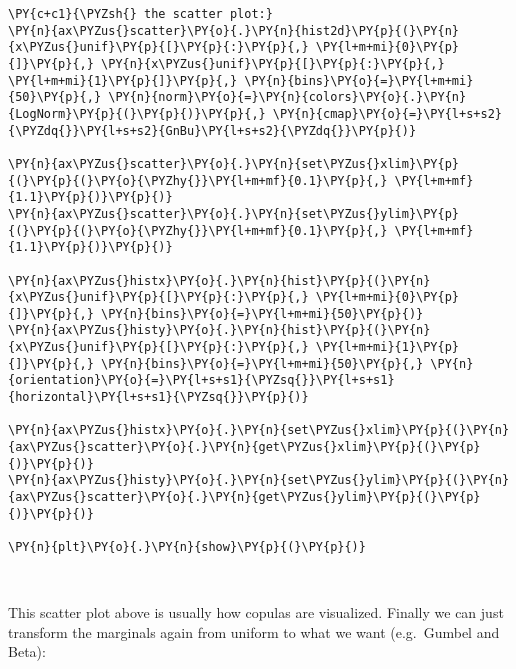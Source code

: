 \begin{tcolorbox}[breakable, size=fbox, boxrule=1pt, pad at break*=1mm,colback=cellbackground, colframe=cellborder]
\begin{Verbatim}[commandchars=\\\{\}]
\PY{c+c1}{\PYZsh{} the scatter plot:}
\PY{n}{ax\PYZus{}scatter}\PY{o}{.}\PY{n}{hist2d}\PY{p}{(}\PY{n}{x\PYZus{}unif}\PY{p}{[}\PY{p}{:}\PY{p}{,} \PY{l+m+mi}{0}\PY{p}{]}\PY{p}{,} \PY{n}{x\PYZus{}unif}\PY{p}{[}\PY{p}{:}\PY{p}{,} \PY{l+m+mi}{1}\PY{p}{]}\PY{p}{,} \PY{n}{bins}\PY{o}{=}\PY{l+m+mi}{50}\PY{p}{,} \PY{n}{norm}\PY{o}{=}\PY{n}{colors}\PY{o}{.}\PY{n}{LogNorm}\PY{p}{(}\PY{p}{)}\PY{p}{,} \PY{n}{cmap}\PY{o}{=}\PY{l+s+s2}{\PYZdq{}}\PY{l+s+s2}{GnBu}\PY{l+s+s2}{\PYZdq{}}\PY{p}{)}

\PY{n}{ax\PYZus{}scatter}\PY{o}{.}\PY{n}{set\PYZus{}xlim}\PY{p}{(}\PY{p}{(}\PY{o}{\PYZhy{}}\PY{l+m+mf}{0.1}\PY{p}{,} \PY{l+m+mf}{1.1}\PY{p}{)}\PY{p}{)}
\PY{n}{ax\PYZus{}scatter}\PY{o}{.}\PY{n}{set\PYZus{}ylim}\PY{p}{(}\PY{p}{(}\PY{o}{\PYZhy{}}\PY{l+m+mf}{0.1}\PY{p}{,} \PY{l+m+mf}{1.1}\PY{p}{)}\PY{p}{)}

\PY{n}{ax\PYZus{}histx}\PY{o}{.}\PY{n}{hist}\PY{p}{(}\PY{n}{x\PYZus{}unif}\PY{p}{[}\PY{p}{:}\PY{p}{,} \PY{l+m+mi}{0}\PY{p}{]}\PY{p}{,} \PY{n}{bins}\PY{o}{=}\PY{l+m+mi}{50}\PY{p}{)}
\PY{n}{ax\PYZus{}histy}\PY{o}{.}\PY{n}{hist}\PY{p}{(}\PY{n}{x\PYZus{}unif}\PY{p}{[}\PY{p}{:}\PY{p}{,} \PY{l+m+mi}{1}\PY{p}{]}\PY{p}{,} \PY{n}{bins}\PY{o}{=}\PY{l+m+mi}{50}\PY{p}{,} \PY{n}{orientation}\PY{o}{=}\PY{l+s+s1}{\PYZsq{}}\PY{l+s+s1}{horizontal}\PY{l+s+s1}{\PYZsq{}}\PY{p}{)}

\PY{n}{ax\PYZus{}histx}\PY{o}{.}\PY{n}{set\PYZus{}xlim}\PY{p}{(}\PY{n}{ax\PYZus{}scatter}\PY{o}{.}\PY{n}{get\PYZus{}xlim}\PY{p}{(}\PY{p}{)}\PY{p}{)}
\PY{n}{ax\PYZus{}histy}\PY{o}{.}\PY{n}{set\PYZus{}ylim}\PY{p}{(}\PY{n}{ax\PYZus{}scatter}\PY{o}{.}\PY{n}{get\PYZus{}ylim}\PY{p}{(}\PY{p}{)}\PY{p}{)}

\PY{n}{plt}\PY{o}{.}\PY{n}{show}\PY{p}{(}\PY{p}{)}
\end{Verbatim}
\end{tcolorbox}

    \begin{center}
    \end{center}
    { \hspace*{\fill} \\}
    
    This scatter plot above is usually how copulas are visualized. Finally
we can just transform the marginals again from uniform to what we want
(e.g.~Gumbel and Beta):


